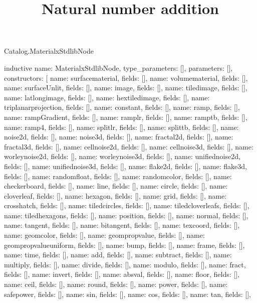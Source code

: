 \begin{lexlean}{Catalog.MaterialxStdlibNode}
\title{Natural number addition}
\begin{semanticmodule}
inductive{
  name: MaterialxStdlibNode,
  type_parameters: [],
  parameters: [],
  constructors: [
    {name: surfacematerial, fields: []},
    {name: volumematerial, fields: []},
    {name: surfaceUnlit, fields: []},
    {name: image, fields: []},
    {name: tiledimage, fields: []},
    {name: latlongimage, fields: []},
    {name: hextiledimage, fields: []},
    {name: triplanarprojection, fields: []},
    {name: constant, fields: []},
    {name: ramp, fields: []},
    {name: rampGradient, fields: []},
    {name: ramplr, fields: []},
    {name: ramptb, fields: []},
    {name: ramp4, fields: []},
    {name: splitlr, fields: []},
    {name: splittb, fields: []},
    {name: noise2d, fields: []},
    {name: noise3d, fields: []},
    {name: fractal2d, fields: []},
    {name: fractal3d, fields: []},
    {name: cellnoise2d, fields: []},
    {name: cellnoise3d, fields: []},
    {name: worleynoise2d, fields: []},
    {name: worleynoise3d, fields: []},
    {name: unifiednoise2d, fields: []},
    {name: unifiednoise3d, fields: []},
    {name: flake2d, fields: []},
    {name: flake3d, fields: []},
    {name: randomfloat, fields: []},
    {name: randomcolor, fields: []},
    {name: checkerboard, fields: []},
    {name: line, fields: []},
    {name: circle, fields: []},
    {name: cloverleaf, fields: []},
    {name: hexagon, fields: []},
    {name: grid, fields: []},
    {name: crosshatch, fields: []},
    {name: tiledcircles, fields: []},
    {name: tiledcloverleafs, fields: []},
    {name: tiledhexagons, fields: []},
    {name: position, fields: []},
    {name: normal, fields: []},
    {name: tangent, fields: []},
    {name: bitangent, fields: []},
    {name: texcoord, fields: []},
    {name: geomcolor, fields: []},
    {name: geompropvalue, fields: []},
    {name: geompropvalueuniform, fields: []},
    {name: bump, fields: []},
    {name: frame, fields: []},
    {name: time, fields: []},
    {name: add, fields: []},
    {name: subtract, fields: []},
    {name: multiply, fields: []},
    {name: divide, fields: []},
    {name: modulo, fields: []},
    {name: fract, fields: []},
    {name: invert, fields: []},
    {name: absval, fields: []},
    {name: floor, fields: []},
    {name: ceil, fields: []},
    {name: round, fields: []},
    {name: power, fields: []},
    {name: safepower, fields: []},
    {name: sin, fields: []},
    {name: cos, fields: []},
    {name: tan, fields: []},
}
\end{semanticmodule}
\end{lexlean}
